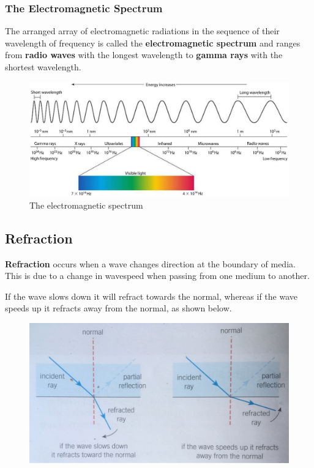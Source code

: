 \subsubsection{The Electromagnetic Spectrum}

The arranged array of electromagnetic radiations in the sequence of their wavelength of frequency is called the \textbf{electromagnetic spectrum} and ranges from \textbf{radio waves} with the longest wavelength to \textbf{gamma rays} with the shortest wavelength. 

\begin{figure}[h!]
    \centering
    \includegraphics[scale=0.4]{notes/images/EM-Spectrum.JPG}
    \caption{The electromagnetic spectrum}
\end{figure}
\FloatBarrier

\subsection{Refraction}

\textbf{Refraction} occurs when a wave changes direction at the boundary of media. This is due to a change in wavespeed when passing from one medium to another. 

If the wave slows down it will refract towards the normal, whereas if the wave speeds up it refracts away from the normal, as shown below.


\begin{figure}[h!]
    \centering
    \includegraphics[scale=0.09]{notes/images/Refraction-2.JPG}
\end{figure}
\FloatBarrier


